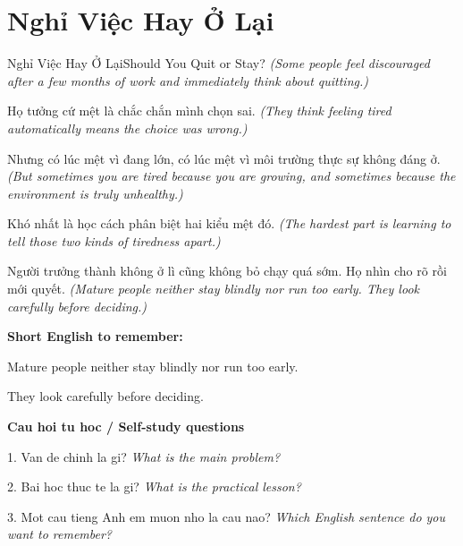 \section{Nghỉ Việc Hay Ở Lại}
\begin{truyen}{Nghỉ Việc Hay Ở Lại}{Should You Quit or Stay?}
\textit{(Some people feel discouraged after a few months of work and immediately think about quitting.)}

Họ tưởng cứ mệt là chắc chắn mình chọn sai.
\textit{(They think feeling tired automatically means the choice was wrong.)}

Nhưng có lúc mệt vì đang lớn, có lúc mệt vì môi trường thực sự không đáng ở.
\textit{(But sometimes you are tired because you are growing, and sometimes because the environment is truly unhealthy.)}

Khó nhất là học cách phân biệt hai kiểu mệt đó.
\textit{(The hardest part is learning to tell those two kinds of tiredness apart.)}

\end{truyen}

\begin{baihoc}
Người trưởng thành không ở lì cũng không bỏ chạy quá sớm. Họ nhìn cho rõ rồi mới quyết.
\textit{(Mature people neither stay blindly nor run too early. They look carefully before deciding.)}
\end{baihoc}

\begin{ghinhoanh}
\textbf{Short English to remember:}

Mature people neither stay blindly nor run too early.

They look carefully before deciding.

\end{ghinhoanh}

\begin{tuhocnhanh}
\textbf{Cau hoi tu hoc / Self-study questions}

1. Van de chinh la gi? \textit{What is the main problem?}

2. Bai hoc thuc te la gi? \textit{What is the practical lesson?}

3. Mot cau tieng Anh em muon nho la cau nao? \textit{Which English sentence do you want to remember?}
\end{tuhocnhanh}

